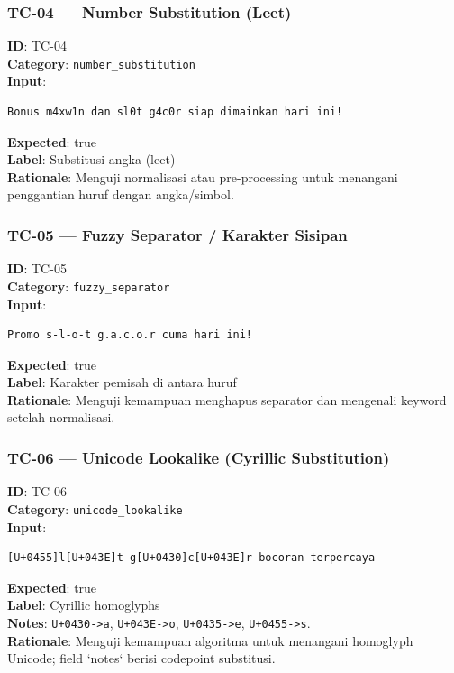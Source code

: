 \subsubsection{TC-04 — Number Substitution (Leet)}
\textbf{ID}: TC-04 \\
\textbf{Category}: \texttt{number\_substitution} \\
\textbf{Input}:
\begin{verbatim}Bonus m4xw1n dan sl0t g4c0r siap dimainkan hari ini!
\end{verbatim}
\textbf{Expected}: true \\
\textbf{Label}: Substitusi angka (leet) \\
\textbf{Rationale}: Menguji normalisasi atau pre-processing untuk menangani penggantian huruf dengan angka/simbol.

\subsubsection{TC-05 — Fuzzy Separator / Karakter Sisipan}
\textbf{ID}: TC-05 \\
\textbf{Category}: \texttt{fuzzy\_separator} \\
\textbf{Input}:
\begin{verbatim}Promo s-l-o-t g.a.c.o.r cuma hari ini!
\end{verbatim}
\textbf{Expected}: true \\
\textbf{Label}: Karakter pemisah di antara huruf \\
\textbf{Rationale}: Menguji kemampuan menghapus separator dan mengenali keyword setelah normalisasi.

\subsubsection{TC-06 — Unicode Lookalike (Cyrillic Substitution)}
\textbf{ID}: TC-06 \\
\textbf{Category}: \texttt{unicode\_lookalike} \\
\textbf{Input}:
\begin{verbatim}[U+0455]l[U+043E]t g[U+0430]c[U+043E]r bocoran terpercaya
\end{verbatim}
\textbf{Expected}: true \\
\textbf{Label}: Cyrillic homoglyphs \\
\textbf{Notes}: \texttt{U+0430->a}, \texttt{U+043E->o}, \texttt{U+0435->e}, \texttt{U+0455->s}. \\
\textbf{Rationale}: Menguji kemampuan algoritma untuk menangani homoglyph Unicode; field `notes` berisi codepoint substitusi.

